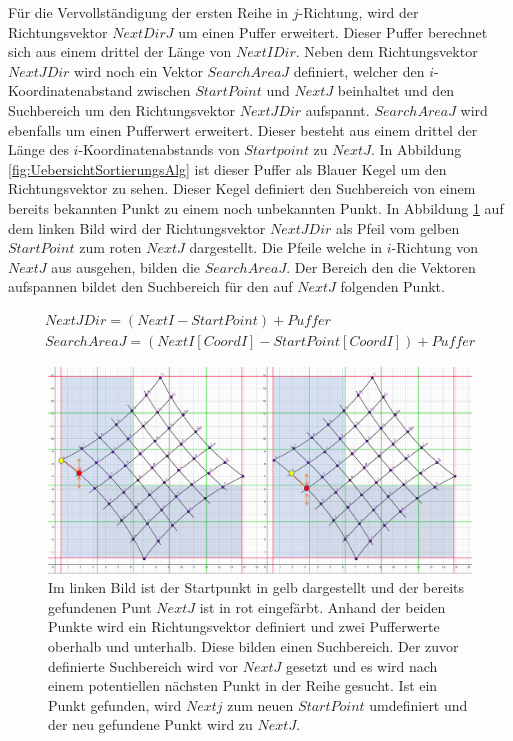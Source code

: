 Für die Vervollständigung der ersten Reihe in $j$-Richtung, wird der Richtungsvektor $NextDirJ$ um einen Puffer erweitert. Dieser Puffer berechnet sich aus einem drittel der Länge von $NextIDir$. Neben dem Richtungsvektor $NextJDir$ wird noch ein Vektor $SearchAreaJ$ definiert, welcher den $i$-Koordinatenabstand zwischen $StartPoint$ und $NextJ$ beinhaltet und den Suchbereich um den Richtungsvektor $NextJDir$ aufspannt. $SearchAreaJ$ wird ebenfalls um einen Pufferwert erweitert. Dieser besteht aus einem drittel der Länge des $i$-Koordinatenabstands von $Startpoint$ zu $NextJ$. In Abbildung \ref{fig:UebersichtSortierungsAlg} ist dieser Puffer als Blauer Kegel um den Richtungsvektor zu sehen. Dieser Kegel definiert den Suchbereich von einem bereits bekannten Punkt zu einem noch unbekannten Punkt. In Abbildung \ref{fig:IListJList} auf dem linken Bild wird der Richtungsvektor $NextJDir$ als Pfeil vom gelben $StartPoint$ zum roten $NextJ$ dargestellt. Die Pfeile welche in $i$-Richtung von $NextJ$ aus ausgehen, bilden die $SearchAreaJ$. Der Bereich den die Vektoren aufspannen bildet den Suchbereich für den auf $NextJ$ folgenden Punkt.

\begin{gather*}
	NextJDir = (NextI - StartPoint) + Puffer\\
	SearchAreaJ = (NextI[CoordI]-StartPoint[CoordI]) + Puffer
\end{gather*}


\begin{figure}[!htb]
	\centering
	\includegraphics[width=0.8\linewidth]{images/VerzeichnetesSchachbrett_4.png}
	\caption[Suche nach $NextJ$]{Im linken Bild ist der Startpunkt in gelb dargestellt und der bereits gefundenen Punt $NextJ$ ist in rot eingefärbt. Anhand der beiden Punkte wird ein Richtungsvektor definiert und zwei Pufferwerte oberhalb und unterhalb. Diese bilden einen Suchbereich. Der zuvor definierte Suchbereich wird vor $NextJ$ gesetzt und es wird nach einem potentiellen nächsten Punkt in der Reihe gesucht. Ist ein Punkt gefunden, wird $Nextj$ zum neuen $StartPoint$ umdefiniert und der neu gefundene Punkt wird zu $NextJ$.}
	\label{fig:IListJList}
\end{figure}
\pagebreak

